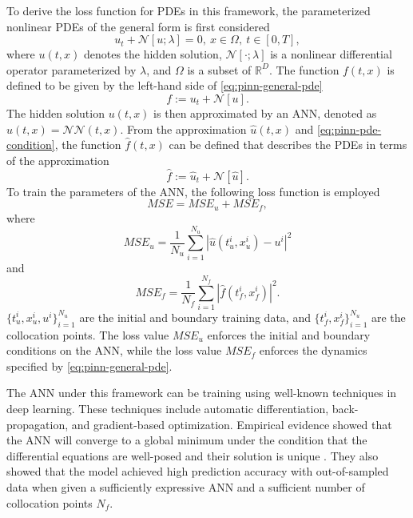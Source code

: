 To derive the loss function for \glspl{PDE} in this framework, the parameterized nonlinear \glspl{PDE} of the general form is first considered \cite{raissiPhysicsinformedNeuralNetworks2019}
\begin{equation}
    u_t + \mathcal{N}[u; \lambda] = 0,\ x \in \Omega,\ t \in [0, T],
    \label{eq:pinn-general-pde}
\end{equation}
where $u(t, x)$ denotes the hidden solution, $\mathcal{N}[\cdot; \lambda]$ is a nonlinear differential operator parameterized by $\lambda$, and $\Omega$ is a subset of $\mathbb{R}^D$.
The function $f(t, x)$ is defined to be given by the left-hand side of \autoref{eq:pinn-general-pde}
\begin{equation}
    f := u_t + \mathcal{N}[u].
    \label{eq:pinn-pde-condition}
\end{equation}
The hidden solution $u(t, x)$ is then approximated by an \gls{ANN}, denoted as $\hat{u}(t, x) = \mathcal{NN}(t, x)$.
From the approximation $\hat{u}(t, x)$ and \autoref{eq:pinn-pde-condition}, the function $\hat{f}(t, x)$ can be defined that describes the \glspl{PDE} in terms of the approximation
\begin{equation*}
    \hat{f} := \hat{u}_t + \mathcal{N}[\hat{u}].
\end{equation*}
To train the parameters of the \gls{ANN}, the following loss function is employed \cite{raissiPhysicsinformedNeuralNetworks2019}
\begin{equation*}
    MSE = MSE_u + MSE_f,
\end{equation*}
where
\begin{equation*}
    MSE_u = \frac{1}{N_u} \sum_{i=1}^{N_u} |\hat{u}(t_u^i, x_u^i) - u^i|^2
\end{equation*}
and
\begin{equation*}
    MSE_f = \frac{1}{N_f} \sum_{i=1}^{N_f} |\hat{f}(t_f^i, x_f^i)|^2.
\end{equation*}
$\{t_u^i, x_u^i, u^i\}_{i=1}^{N_u}$ are the initial and boundary training data, and $\{t_f^i, x_f^i\}_{i=1}^{N_u}$ are the collocation points.
The loss value $MSE_u$ enforces the initial and boundary conditions on the \gls{ANN}, while the loss value $MSE_f$ enforces the dynamics specified by \autoref{eq:pinn-general-pde}.

The \gls{ANN} under this framework can be training using well-known techniques in deep learning.
These techniques include automatic differentiation, back-propagation, and gradient-based optimization.
Empirical evidence showed that the \gls{ANN} will converge to a global minimum under the condition that the differential equations are well-posed and their solution is unique \cite{raissiPhysicsinformedNeuralNetworks2019}.
They also showed that the model achieved high prediction accuracy with out-of-sampled data when given a sufficiently expressive \gls{ANN} and a sufficient number of collocation points $N_f$.